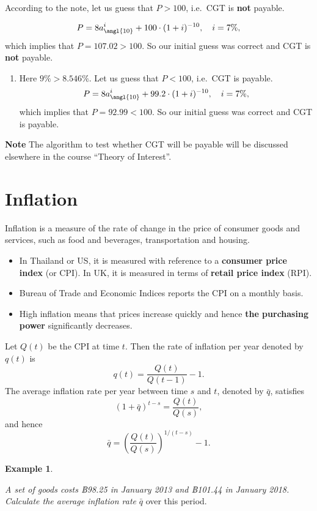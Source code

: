 \documentclass[
]{book}
\providecommand{\tightlist}{%
  \setlength{\itemsep}{0pt}\setlength{\parskip}{0pt}}
\theoremstyle{definition}
\theoremstyle{definition}
\newtheorem{example}{Example}[chapter]
\theoremstyle{definition}
\theoremstyle{definition}
\theoremstyle{remark}
\begin{document}
According to the note, let us guess that \(P > 100\), i.e.~CGT is \textbf{not}
payable.

\[ P = 8 a^i_{\angl{10}} +  100\cdot (1+i)^{-10}, \quad i = 7\%,\] which
implies that \(P = 107.02 > 100\). So our initial guess was correct and
CGT is \textbf{not} payable.

\begin{enumerate}
\def\labelenumi{\arabic{enumi}.}
\setcounter{enumi}{2}
\tightlist
\item
  Here \(9\% > 8.546\%\). Let us guess that \(P < 100\), i.e.~CGT is
  payable.
  \[ P = 8 a^i_{\angl{10}} +  99.2\cdot (1+i)^{-10}, \quad i = 7\%,\]
  which implies that \(P = 92.99 < 100\). So our initial guess was
  correct and CGT is payable.
\end{enumerate}

\textbf{Note} The algorithm to test whether CGT will be payable will be
discussed elsewhere in the course ``Theory of Interest''.

\hypertarget{inflation}{%
\section{Inflation}\label{inflation}}

Inflation is a measure of the rate of change in the price of consumer
goods and services, such as food and beverages, transportation and
housing.

\begin{itemize}
\item
  In Thailand or US, it is measured with reference to a \textbf{consumer
  price index} (or CPI). In UK, it is measured in terms of \textbf{retail
  price index} (RPI).
\item
  Bureau of Trade and Economic Indices reports the CPI on a monthly
  basis.
\item
  High inflation means that prices increase quickly and hence \textbf{the
  purchasing power} significantly decreases.
\end{itemize}

Let \(Q(t)\) be the CPI at time \(t\). Then the rate of inflation per year
denoted by \(q(t)\) is \[q(t) = \frac{Q(t)}{Q(t-1)} - 1.\] The average
inflation rate per year between time \(s\) and \(t\), denoted by \(\bar{q}\),
satisfies \[(1 + \bar{q})^{t-s} = \frac{Q(t)}{Q(s)},\] and hence
\[\bar{q} = \left( \frac{Q(t)}{Q(s)}  \right)^{1/(t-s)} - 1.\]

\begin{example}
\protect\hypertarget{exm:unlabeled-div-59}{}\label{exm:unlabeled-div-59}

\emph{A set of goods costs ฿98.25 in January 2013 and ฿101.44 in January
2018. Calculate the average inflation rate} \(\bar{q}\) over this period.

\end{example}
\end{document}
